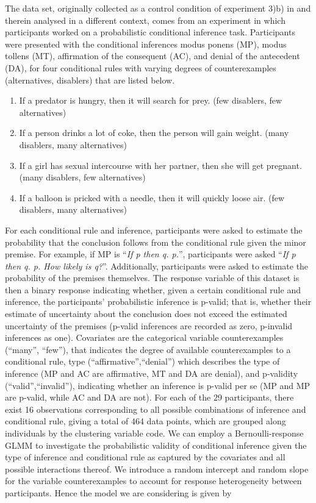 \documentclass[11pt, a4paper]{article}
\theoremstyle{example} \newtheorem{example}{Example}[section]
\theoremstyle{theorem} \newtheorem{theorem}{Theorem}[section]
\begin{document}
The data set, originally collected as a control condition of experiment 3)b) in \citet{singmann2016probabilistic} and therein analysed in a different context, comes from an experiment in which participants worked on a probabilistic conditional inference task. Participants were presented with the conditional inferences modus ponens (MP), modus tollens (MT), affirmation of the consequent (AC), and denial of the antecedent (DA), for four conditional rules with varying degrees of counterexamples (alternatives, disablers) that are listed below.
\begin{enumerate}
	\item If a predator is hungry, then it will search for prey. (few disablers, few alternatives)
	\item If a person drinks a lot of coke, then the person will gain weight. (many disablers, many alternatives)
	\item If a girl has sexual intercourse with her partner, then she will get pregnant. (many disablers, few alternatives)
	\item If a balloon is pricked with a needle, then it will quickly loose air. (few disablers, many alternatives)
\end{enumerate}
For each conditional rule and inference, participants were asked to estimate the probability that the conclusion follows from the conditional rule given the minor premise. For example, if MP is ``\textit{If p then q. p.}'', participants were asked ``\textit{If p then q. p. How likely is q?}''. Additionally, participants were asked to estimate the probability of the premises themselves. The response variable of this dataset is then a binary response indicating whether, given a certain conditional rule and inference, the participants' probabilistic inference is p-valid; that is, whether their estimate of uncertainty about the conclusion does not exceed the estimated uncertainty of the premises (p-valid inferences are recorded as zero, p-invalid inferences as one). Covariates are the categorical variable counterexamples (``many'', ``few''), that indicates the degree of available counterexamples to a conditional rule, type (``affirmative'',``denial'') which describes the type of inference (MP and AC are affirmative, MT and DA are denial), and p-validity (``valid'',``invalid''), indicating whether an inference is p-valid per se (MP and MP are p-valid, while AC and DA are not). For each of the 29 participants, there exist 16 observations corresponding to all possible combinations of inference and conditional rule, giving a total of 464 data points, which are grouped along individuals by the clustering variable code. We can employ a Bernoulli-response GLMM to investigate the probabilistic validity of conditional inference given the type of inference and conditional rule as captured by the covariates and all possible interactions thereof. We introduce a random intercept and random slope for the variable counterexamples to account for response heterogeneity between participants. Hence the model we are considering is given by    
\end{document}
